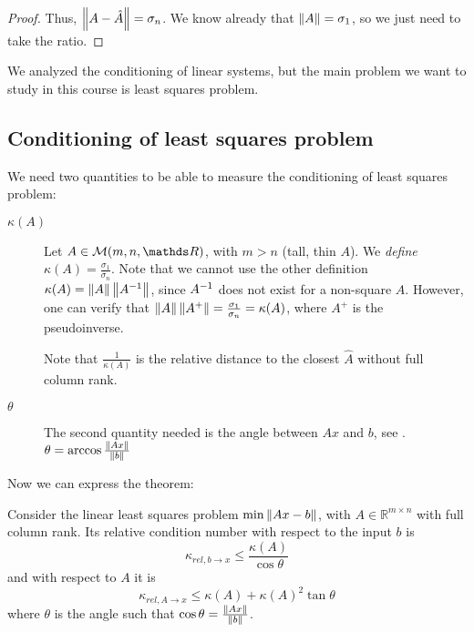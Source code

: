 \documentclass[computational_mathematics.tex]{subfiles}
\begin{document}
\begin{proof}
Thus, $\left\lVert A - \hat{A}\right\rVert = \sigma_n$. We know already that $\left\lVert A\right\rVert=\sigma_1$, so we just need to take the ratio.
\end{proof}


We analyzed the conditioning of linear systems, but the main problem we want to study in this course is least squares problem.

\subsection{Conditioning of least squares problem}

We need two quantities to be able to measure the conditioning of least squares problem:

\begin{description}
  \item[ $\kappa(A)$]
Let $A \in \mathcal{M}(m, n, \R)$, with $m > n$ (tall, thin $A$). We \emph{define} $\kappa(A) = \frac{\sigma_1}{\sigma_n}$. Note that we cannot use the other definition $\kappa(A)=\left\lVert A\right\rVert\left\lVert{A}^{-1}\right\rVert$, since ${A}^{-1}$ does not exist for a non-square $A$. However, one can verify that $\left\lVert A\right\rVert \left\lVert A^{+}\right\rVert = \frac{\sigma_1}{\sigma_n}=\kappa(A)$, where $A^+$ is the pseudoinverse.

\begin{obs}
  Note that $\frac{1}{\kappa(A)}$ is the relative distance to the closest $\hat{A}$ without full column rank.
\end{obs}

  \item[ $\theta$]
    The second quantity needed is the angle between $Ax$ and $b$, see .
$\theta = \arccos \frac{\left\lVert Ax\right\rVert}{\left\lVert b\right\rVert}$
\end{description}

Now we can express the theorem:

\begin{theorem}
Consider the linear least squares problem $\min \left\lVert Ax-b\right\rVert$, with $A\in\mathbb{R}^{m\times n}$ with full column rank. Its relative condition number with respect to the input $b$ is
\[
\kappa_{rel, b \to x} \leq \frac{\kappa(A)}{\cos\theta}
\]
and with respect to $A$ it is
\[
  \kappa_{rel, A \to x} \leq \kappa(A) + {\kappa(A)}^2 \tan \theta
\]
where $\theta$ is the angle such that $\cos \theta = \frac{\left\lVert Ax\right\rVert}{\left\lVert b\right\rVert}$.
\end{theorem}
\end{document}
